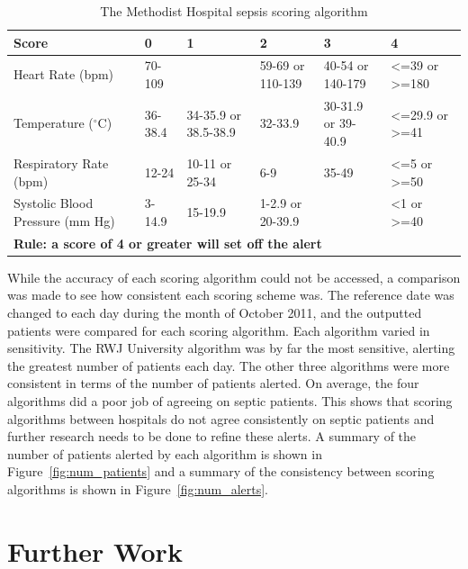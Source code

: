 \documentclass{sig-alternate}
\begin{document}
\begin{table}
\renewcommand{\arraystretch}{1.5}
  \begin{tabular}{| l | l | l | l | l | l |}
\hline

{\bf Score} & {\bf 0} & {\bf 1} & {\bf 2} & {\bf 3} & {\bf 4}\\ \hline
Heart Rate (bpm) & 70-109 & & 59-69 or 110-139 & 40-54 or 140-179 & <=39 or >=180\\ \hline
Temperature ($^\circ$C) & 36-38.4 & 34-35.9 or 38.5-38.9 & 32-33.9 & 30-31.9 or 39-40.9 & <=29.9 or >=41\\ \hline
Respiratory Rate (bpm) & 12-24 & 10-11 or 25-34 & 6-9 & 35-49 & <=5 or >=50\\ \hline
Systolic Blood Pressure (mm Hg) & 3-14.9 & 15-19.9 & 1-2.9 or 20-39.9 & & <1 or >=40\\ \hline
 \multicolumn{6}{|l|}{\bf Rule: a score of 4 or greater will set off the alert} \\ \hline
 \end{tabular}
	\caption{The Methodist Hospital sepsis scoring algorithm}
  \label{tab:mh_table}
\end{table}

While the accuracy of each scoring algorithm could not be accessed, a comparison was made to see how consistent each scoring scheme was.  The reference date was changed to each day during the month of October 2011, and the outputted patients were compared for each scoring algorithm.  Each algorithm varied in sensitivity.  The RWJ University algorithm was by far the most sensitive, alerting the greatest number of patients each day.  The other three algorithms were more consistent in terms of the number of patients alerted.  On average, the four algorithms did a poor job of agreeing on septic patients.  This shows that scoring algorithms between hospitals do not agree consistently on septic patients and further research needs to be done to refine these alerts.  A summary of the number of patients alerted by each algorithm is shown in Figure~\ref{fig:num_patients} and a summary of the consistency between scoring algorithms is shown in Figure~\ref{fig:num_alerts}.

\vspace{10pt}
\section{Further Work}
\vspace{10pt}
\label{sec:furtherwork}
\end{document}
